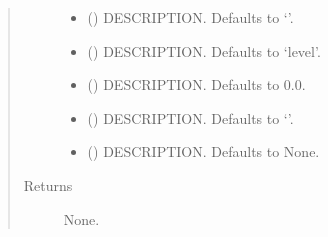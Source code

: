 \documentclass[letterpaper,10pt,english]{sphinxmanual}
\begin{document}
\begin{fulllineitems}
\begin{fulllineitems}
\begin{quote}
\begin{description}
\begin{itemize}
\item {} 
\sphinxAtStartPar
{} (\sphinxstyleliteralemphasis{\sphinxupquote{, }}) \textendash{} DESCRIPTION. Defaults to ‘’.

\item {} 
\sphinxAtStartPar
{} (\sphinxstyleliteralemphasis{\sphinxupquote{, }}) \textendash{} DESCRIPTION. Defaults to ‘level’.

\item {} 
\sphinxAtStartPar
{} (\sphinxstyleliteralemphasis{\sphinxupquote{, }}) \textendash{} DESCRIPTION. Defaults to 0.0.

\item {} 
\sphinxAtStartPar
{} (\sphinxstyleliteralemphasis{\sphinxupquote{, }}) \textendash{} DESCRIPTION. Defaults to ‘’.

\item {} 
\sphinxAtStartPar
{} (\sphinxstyleliteralemphasis{\sphinxupquote{, }}) \textendash{} DESCRIPTION. Defaults to None.

\end{itemize}

\item[{Returns}] \leavevmode
\sphinxAtStartPar
None.

\end{description}\end{quote}

\end{fulllineitems}



\end{fulllineitems}
\end{document}
